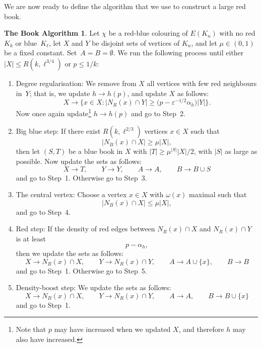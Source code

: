 \documentclass[12pt,reqno]{amsart}
\theoremstyle{definition}
\newtheorem*{RBalg}{The Book Algorithm}
\theoremstyle{remark}
\newcommand\N{\mathbb{N}}
\newcommand\eps{\varepsilon}
\renewcommand{\le}{\leqslant}
\renewcommand{\ge}{\geqslant}
\renewcommand{\to}{\rightarrow}
\def\eps{\varepsilon}
\def\N{\mathbb{N}}
\begin{document}
We are now ready to define the algorithm that we use to construct a large red book. 

\begin{RBalg}
Let $\chi$ be a red-blue colouring of $E(K_n)$ with no red $K_k$ or blue~$K_\ell$, let $X$ and $Y$ be disjoint sets of vertices of $K_n$, and let $\mu \in (0,1)$ be a fixed constant. 
Set~$A = B = \emptyset$. We run the following process until either $|X| \le R(k,\ell^{3/4})$ or $p \le 1/k$:\smallskip %
\begin{enumerate}[label=\arabic*., ref=\arabic*] %
\item\label{Alg:Step1} Degree regularisation: We remove from $X$ all vertices with few red neighbours in~$Y$; that is, we update $h \to h(p)$, and update $X$ as follows:
$$X \to \big\{ x \in X : |N_R(x) \cap Y| \ge \big( p - \eps^{-1/2} \alpha_h \big) |Y| \big\}.$$ 
Now once again update\footnote{Note that $p$ may have increased when we updated $X$, and therefore $h$ may also have increased.} $h \to h(p)$ %
and go to Step~2.\smallskip 
\item\label{Alg:Step2} Big blue step: If there exist $R(k,\ell^{2/3})$ vertices $x \in X$ such that
$$|N_B(x) \cap X| \ge \mu |X|,$$
then let $(S,T)$ be a blue book in $X$ with $|T| \ge \mu^{|S|} |X|/2$, with $|S|$ as large as possible. 
Now update the sets as follows:
$$X \to T, \qquad Y \to Y, \qquad A \to A, \qquad B \to B \cup S$$
and go to Step~1. Otherwise go to Step~3.\smallskip
\item\label{Alg:Step3} The central vertex: Choose a vertex $x \in X$ with $\omega(x)$ maximal such that
$$|N_B(x) \cap X| \le \mu |X|,$$
and go to Step~4.\smallskip
\item\label{Alg:Step4} Red step: If the density of red edges between $N_R(x) \cap X$ and $N_R(x) \cap Y$ is at least 
$$p - \alpha_h,$$
then we update the sets as follows:
$$X \to N_R(x) \cap X, \qquad Y \to N_R(x) \cap Y, \qquad A \to A \cup \{x\}, \qquad B \to B$$
and go to Step~1. Otherwise go to Step~5.\smallskip
\item\label{Alg:Step5} Density-boost step: We update the sets as follows:
$$X \to N_B(x) \cap X, \qquad Y \to N_R(x) \cap Y, \qquad A \to A, \qquad B \to B \cup \{x\}$$
and go to Step~1.
\end{enumerate}  
\end{RBalg} 
\end{document}

